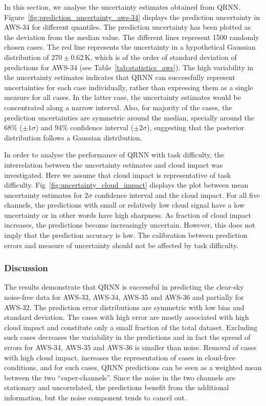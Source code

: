 \documentclass[amt, manuscript]{copernicus}
\begin{document}
In this section, we analyse the uncertainty estimates obtained from QRNN.  Figure~\ref{fig:prediction_uncertainty_aws-34} displays the prediction uncertainty in AWS-34 for different quantiles. The prediction uncertainty has been plotted as the deviation from the median value.  The different lines represent 1500 randomly chosen cases.  The red line represents the uncertainty in a hypothetical Gaussian distribution of $270\pm0.62$\,K, which is of the order of standard deviation of predictions for AWS-34 (see Table~\ref{tab:statistics_aws}). The high variability in the uncertainty estimates indicates that QRNN can successfully represent uncertainties for each case individually, rather than expressing them as a single measure for all cases. In the latter case, the uncertainty estimates would be concentrated along a narrow interval. Also, for majority of the cases, the prediction uncertainties are symmetric around the median, specially around  the 68\% ($\pm 1 \sigma$) and 94\% confidence interval ($\pm 2 \sigma$), suggesting that the posterior distribution follows a Gaussian distribution. 

In order to analyse the performance of QRNN with task difficulty, the interrelation between the uncertainty estimates and cloud impact was investigated. Here we assume that cloud impact is representative of task difficulty. Fig~\ref{fig:uncertainty_cloud_impact} displays the plot between mean uncertainty estimates for $2\sigma$ confidence interval and the cloud impact. For all five channels, the predictions with small or relatively low cloud signal have a low uncertainty or in other words have high sharpness. As fraction of cloud impact increases, the predictions become increasingly uncertain. However, this does not imply that the prediction accuracy is low. The calibration between prediction errors and measure of uncertainty should not be affected by task difficulty.


\subsubsection{Discussion}
%
The results demonstrate that QRNN is successful in predicting the clear-sky
noise-free data for AWS-33, AWS-34, AWS-35 and AWS-36 and partially for AWS-32. The prediction error distributions are symmetric with low bias and standard deviation. The cases with high error are mostly associated with high cloud impact and constitute only a small fraction of the total dataset. Excluding such cases decreases the variability in the predictions and in fact the spread of errors for AWS-34, AWS-35 and AWS-36 is smaller than noise. Removal of cases with high cloud impact, increases the representation of cases in cloud-free conditions, and for such cases, QRNN predictions can be seen as a weighted mean between the two ``super-channels''. Since the noise in the two channels are stationary and uncorrelated, the predictions benefit from the additional information, but the noise component tends to cancel out. 
\end{document}
